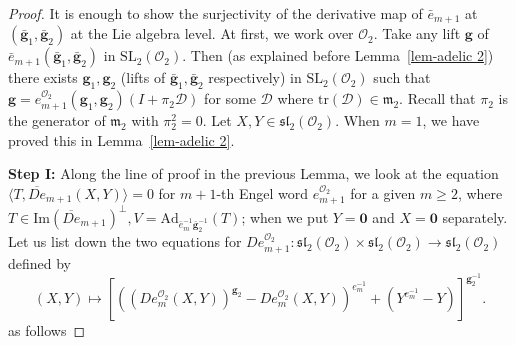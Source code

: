 \documentclass[10pt,twoside]{amsart}
\newcommand{\SL}{\mathrm{SL}}
\newcommand{\tr}{\mathrm{tr}}
\newcommand{\im}{\mathrm{Im}}
\newcommand{\R}{\mathcal{O}_2}
\theoremstyle{definition}
\theoremstyle{definition}
\begin{document}
\begin{proof}
It is enough to show the surjectivity of the derivative map of $\bar e_{m+1}$ at $(\mathbf{\bar g}_1, \mathbf{\bar g}_2)$ at the Lie algebra level. At first, we work over $\mathcal O_2$. Take any lift $\mathbf{g}$ of $\bar e_{m+1}(\mathbf{\bar g}_1,\mathbf{\bar g}_2)$ in $\SL_2(\mathcal{O}_2)$. Then (as explained before Lemma~\ref{lem-adelic 2}) there exists $\mathbf{g}_1,\mathbf{g}_2$ (lifts of $\mathbf{\bar g}_1,\mathbf{\bar g}_2$ respectively) in $\SL_2(\mathcal{O}_2)$ such that $\mathbf{g}=e_{m+1}^{\R}(\mathbf{g}_1,\mathbf{g}_2)(I+\pi_2 \mathcal{D})$ for some $\mathcal D$ where $\tr(\mathcal{D})\in \mathfrak{m}_2$. Recall that $\pi_2$ is the generator of $\mathfrak{m}_2$ with $\pi_2^2=0$. Let $X, Y\in \mathfrak{sl}_2(\mathcal{O}_2)$. When $m=1$, we have proved this in Lemma~\ref{lem-adelic 2}. 
    
    
{\bf Step I:}  Along the line of proof in the previous Lemma, we look at the equation $\langle T, \overline{De}_{m+1}(X, Y)\rangle = 0$ for $m+1$-th Engel word $ e_{m+1}^{\R}$ for a given $m\geq 2$, where $T\in \im(\overline{De}_{m+1})^{\perp}, V=\mathrm{Ad}_{\bar e_m^{-1}\mathbf{\bar g}_2^{-1}}(T)$; when we put $Y=\mathbf{0}$ and $X=\mathbf{0}$ separately. Let us list down the two equations for $De^{\R}_{m+1}\colon  \mathfrak{sl}_2(\mathcal{O}_2) \times\mathfrak{sl}_2(\mathcal{O}_2) \rightarrow \mathfrak{sl}_2(\mathcal{O}_2)$ defined by $$(X, Y)\mapsto [((De_m^{\R}(X,Y))^{\mathbf{g}_2} - De_m^{\R}(X,Y))^{e_m^{-1}}+(Y^{e_m^{-1}}-Y)]^{\mathbf{g}_2^{-1}}.$$  
as follows


\end{proof}
\end{document}
